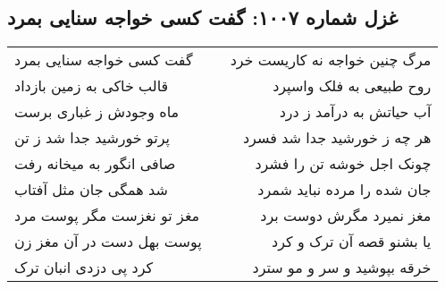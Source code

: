 \begin{center}
\section*{غزل شماره ۱۰۰۷: گفت کسی خواجه سنایی بمرد}
\label{sec:1007}
\begin{longtable}{l p{0.5cm} r}
گفت کسی خواجه سنایی بمرد
&&
مرگ چنین خواجه نه کاریست خرد
\\
قالب خاکی به زمین بازداد
&&
روح طبیعی به فلک واسپرد
\\
ماه وجودش ز غباری برست
&&
آب حیاتش به درآمد ز درد
\\
پرتو خورشید جدا شد ز تن
&&
هر چه ز خورشید جدا شد فسرد
\\
صافی انگور به میخانه رفت
&&
چونک اجل خوشه تن را فشرد
\\
شد همگی جان مثل آفتاب
&&
جان شده را مرده نباید شمرد
\\
مغز تو نغزست مگر پوست مرد
&&
مغز نمیرد مگرش دوست برد
\\
پوست بهل دست در آن مغز زن
&&
یا بشنو قصه آن ترک و کرد
\\
کرد پی دزدی انبان ترک
&&
خرقه بپوشید و سر و مو سترد
\\
\end{longtable}
\end{center}
